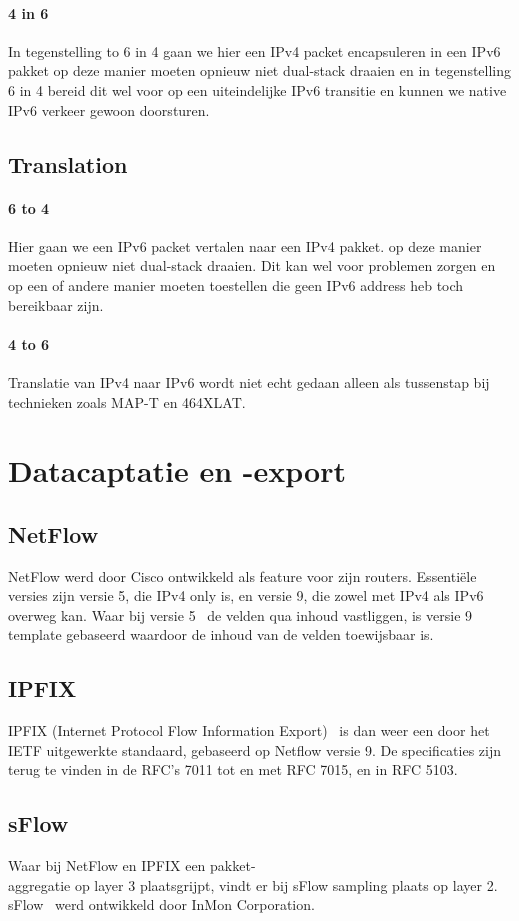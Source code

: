 
\paragraph{4 in 6}
In tegenstelling to 6 in 4 gaan  we hier een IPv4 packet encapsuleren in een IPv6 pakket op deze manier moeten opnieuw niet dual-stack draaien en in tegenstelling 6 in 4 bereid dit wel voor op een uiteindelijke IPv6 transitie en kunnen we native IPv6 verkeer gewoon doorsturen.


\subsection{Translation}
\paragraph{6 to 4}
Hier gaan we een IPv6 packet vertalen naar een IPv4 pakket. op deze manier moeten opnieuw niet dual-stack draaien. Dit kan wel voor problemen zorgen en op een of andere manier moeten toestellen die geen IPv6 address heb toch bereikbaar zijn.

\paragraph{4 to 6}
Translatie van IPv4 naar IPv6 wordt niet echt gedaan alleen als tussenstap bij technieken zoals MAP-T en 464XLAT.

\section{Datacaptatie en -export}
\subsection{NetFlow}
NetFlow werd door Cisco ontwikkeld als feature voor zijn routers. Essentiële versies zijn versie 5, die IPv4 only is, en versie 9, die zowel met IPv4 als IPv6 overweg kan. Waar bij versie 5~\autocite{Cisco2007} de velden qua inhoud vastliggen, is versie 9~\autocite{Claise2004} template gebaseerd waardoor de inhoud van de velden toewijsbaar is.

\subsection{IPFIX}
IPFIX (Internet Protocol Flow Information Export)~\autocite{Aitken2013} is dan weer een door het IETF uitgewerkte standaard, gebaseerd op Netflow versie 9. De specificaties zijn terug te vinden in de RFC’s 7011 tot en met RFC 7015, en in RFC 5103.

\subsection{sFlow}
Waar bij NetFlow en IPFIX een pakket-\\aggregatie op layer 3 plaatsgrijpt, vindt er bij sFlow sampling plaats op layer 2. sFlow~\autocite{Phaal2004} werd ontwikkeld door InMon Corporation.
